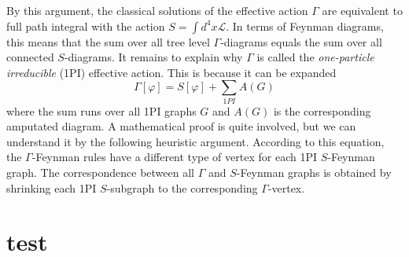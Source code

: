 \documentclass[12pt]{article}
\begin{document}
By this argument, the classical solutions of the effective action
$\Gamma$ are equivalent to full path integral with the action $S=\int
d^4x \mathcal{L}$. In terms of Feynman diagrams, this means that the
sum over all tree level $\Gamma$-diagrams equals the sum over all
connected $S$-diagrams. It remains to explain why $\Gamma$ is called
the \emph{one-particle irreducible} (1PI) effective action. This is
because it can be expanded
\begin{equation}
  \Gamma[\varphi] = S[\varphi] + \sum_{1PI} A(G)
\end{equation}
where the sum runs over all 1PI graphs $G$ and $A(G)$ is the
corresponding amputated diagram. A mathematical proof is quite
involved, but we can understand it by the following heuristic
argument. According to this equation, the $\Gamma$-Feynman rules have
a different type of vertex for each 1PI $S$-Feynman graph. The
correspondence between all $\Gamma$ and $S$-Feynman graphs is obtained
by shrinking each 1PI $S$-subgraph to the corresponding
$\Gamma$-vertex.




\newpage
\appendix

\section{test}



 
\renewcommand{\refname}{Bibliography}

\end{document}
